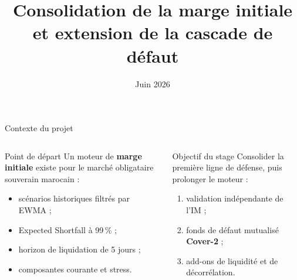 \documentclass[10pt,aspectratio=169]{beamer}
\title[Consolidation de l'IM et Cover-2]{Consolidation de la marge initiale\\et extension de la cascade de défaut}
\subtitle{}
\author{}
\institute{\Large\textbf{Quant Factory}}
\date{Juin 2026}
\newcommand{\keyword}[1]{\textcolor{AccentBlue}{\textbf{#1}}}
\begin{document}
\begin{frame}
  \titlepage
\end{frame}

\begin{frame}{Contexte du projet}
  \begin{columns}[T,onlytextwidth]
    \begin{block}{Point de départ}
      Un moteur de \keyword{marge initiale} existe pour le marché obligataire
      souverain marocain :
      \begin{itemize}
        \item scénarios historiques filtrés par EWMA ;
        \item Expected Shortfall à 99\,\% ;
        \item horizon de liquidation de 5 jours ;
        \item composantes courante et stress.
      \end{itemize}
    \end{block}

    \begin{block}{Objectif du stage}
      Consolider la première ligne de défense, puis prolonger le moteur :
      \begin{enumerate}
        \item validation indépendante de l'IM ;
        \item fonds de défaut mutualisé \keyword{Cover-2} ;
        \item add-ons de liquidité et de décorrélation.
      \end{enumerate}
    \end{block}
  \end{columns}

  \vspace{0.35cm}
  \centering
\end{frame}
\end{document}
